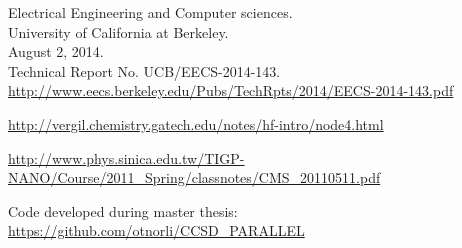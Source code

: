 \documentclass[a4paper,norsk,11pt,twoside]{report}
\begin{document}
\begin{thebibliography}{}
Electrical Engineering and Computer sciences. \\
University of California at Berkeley. \\
August 2, 2014. \\
Technical Report No. UCB/EECS-2014-143. \\
\url{http://www.eecs.berkeley.edu/Pubs/TechRpts/2014/EECS-2014-143.pdf}

\url{http://vergil.chemistry.gatech.edu/notes/hf-intro/node4.html}

\url{http://www.phys.sinica.edu.tw/TIGP-NANO/Course/2011_Spring/classnotes/CMS_20110511.pdf}

Code developed during master thesis:\\
\url{https://github.com/otnorli/CCSD_PARALLEL}

 \end{thebibliography}
\end{document}
